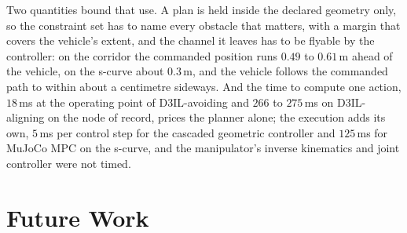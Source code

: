Two quantities bound that use. A plan is held inside the declared geometry only, so the constraint set
has to name every obstacle that matters, with a margin that covers the vehicle's extent, and the
channel it leaves has to be flyable by the controller: on the corridor the commanded position runs
$0.49$ to $0.61$\,m ahead of the vehicle, on the s-curve about $0.3$\,m, and the vehicle follows the
commanded path to within about a centimetre sideways. And the time to compute one action, $18$\,ms at
the operating point of D3IL-avoiding and $266$ to $275$\,ms on D3IL-aligning on the node of record,
prices the planner alone; the execution adds its own, $5$\,ms per control step for the cascaded
geometric controller and $125$\,ms for MuJoCo MPC on the s-curve, and the manipulator's inverse
kinematics and joint controller were not timed. 

\section{Future Work}\label{sec:conc:future}

